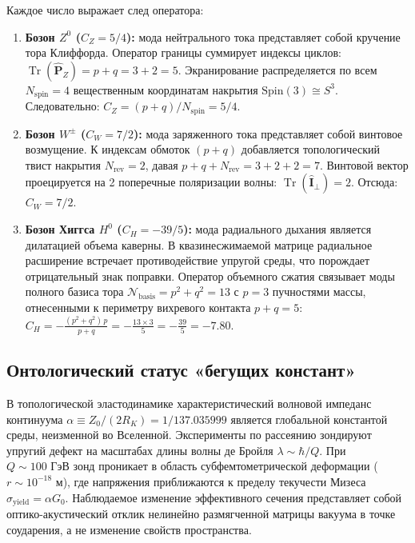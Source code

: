 \documentclass[11pt,a4paper]{article}
\theoremstyle{definition}
\theoremstyle{remark}
\begin{document}
Каждое число выражает след оператора:
\begin{enumerate}
	\item \textbf{Бозон $Z^0$ ($C_Z = 5/4$):} мода нейтрального тока представляет собой кручение тора Клиффорда. Оператор границы суммирует индексы циклов: $\operatorname{Tr}(\hat{\mathbf{P}}_Z) = p + q = 3 + 2 = 5$. Экранирование распределяется по всем $N_{\mathrm{spin}} = 4$ вещественным координатам накрытия $\mathrm{Spin}(3) \cong S^3$. Следовательно: $C_Z = (p + q) / N_{\mathrm{spin}} = 5/4$.
	\item \textbf{Бозон $W^\pm$ ($C_W = 7/2$):} мода заряженного тока представляет собой винтовое возмущение. К индексам обмоток $(p+q)$ добавляется топологический твист накрытия $N_{\mathrm{rev}} = 2$, давая $p + q + N_{\mathrm{rev}} = 3 + 2 + 2 = 7$. Винтовой вектор проецируется на 2 поперечные поляризации волны: $\operatorname{Tr}(\hat{\mathbf{I}}_{\perp}) = 2$. Отсюда: $C_W = 7/2$.
	\item \textbf{Бозон Хиггса $H^0$ ($C_H = -39/5$):} мода радиального дыхания является дилатацией объема каверны. В квазинесжимаемой матрице радиальное расширение встречает противодействие упругой среды, что порождает отрицательный знак поправки. Оператор объемного сжатия связывает моды полного базиса тора $\mathcal{N}_{\mathrm{basis}} = p^2 + q^2 = 13$ с $p=3$ пучностями массы, отнесенными к периметру вихревого контакта $p + q = 5$: $C_H = -\frac{(p^2 + q^2) \, p}{p + q} = -\frac{13 \times 3}{5} = -\frac{39}{5} = -7.80$.
\end{enumerate}

\subsection{Онтологический статус «бегущих констант»}

В топологической эластодинамике характеристический волновой импеданс континуума $\alpha \equiv Z_0 / (2 R_K) = 1/137.035999$ является глобальной константой среды, неизменной во Вселенной. Эксперименты по рассеянию зондируют упругий дефект на масштабах длины волны де Бройля $\lambda \sim \hbar / Q$. При $Q \sim 100\text{ ГэВ}$ зонд проникает в область субфемтометрической деформации ($r \sim 10^{-18}\text{ м}$), где напряжения приближаются к пределу текучести Мизеса $\sigma_{\mathrm{yield}} = \alpha G_0$. Наблюдаемое изменение эффективного сечения представляет собой оптико-акустический отклик нелинейно размягченной матрицы вакуума в точке соударения, а не изменение свойств пространства.
\end{document}

